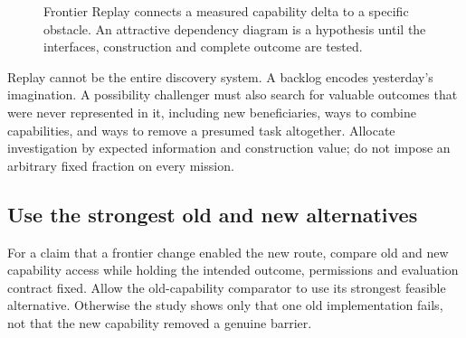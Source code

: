 \begin{figure}[htbp]
\centering
{}
\caption{Frontier Replay connects a measured capability delta to a specific obstacle. An attractive dependency diagram is a hypothesis until the interfaces, construction and complete outcome are tested.}
\end{figure}

Replay cannot be the entire discovery system. A backlog encodes yesterday's imagination. A possibility challenger must also search for valuable outcomes that were never represented in it, including new beneficiaries, ways to combine capabilities, and ways to remove a presumed task altogether. Allocate investigation by expected information and construction value; do not impose an arbitrary fixed fraction on every mission.

\subsection{Use the strongest old and new alternatives}
For a claim that a frontier change enabled the new route, compare old and new capability access while holding the intended outcome, permissions and evaluation contract fixed. Allow the old-capability comparator to use its strongest feasible alternative. Otherwise the study shows only that one old implementation fails, not that the new capability removed a genuine barrier.


